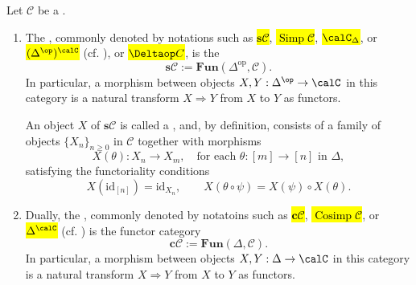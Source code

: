 \begin{definition} \label{definition:simplicial_cosimplicial_object_in_a_category}
    Let $\mathcal{C}$ be a .
    \begin{enumerate}
        \item   
        The , commonly denoted by notations such as \hl{$\mathbf{s}\mathcal{C}$}, \hl{$\operatorname{Simp} \mathcal{C}$}, \hl{$\calC_\Delta$}, or \hl{$(\Delta^{\op})^{\calC}$} (cf. ), or \hl{$\Deltaop C$}, is the 
        $$ \mathbf{s}\mathcal{C} := \mathbf{Fun}(\Delta^{\mathrm{op}}, \mathcal{C}).$$
          In particular, a morphism between objects $X,Y:\Delta^{\op} \to \calC$ in this category is a natural transform $X \Rightarrow Y$ from $X$ to $Y$ as functors. 

        An object $X$ of $\mathbf{s}\mathcal{C}$ is called a , and, by definition, consists of a family of objects $\{X_n\}_{n \ge 0}$ in $\mathcal{C}$ together with morphisms
        $$ X(\theta) : X_n \to X_m, \quad \text{for each } \theta : [m] \to [n] \text{ in } \Delta, $$
        satisfying the functoriality conditions
        $$ X(\mathrm{id}_{[n]}) = \mathrm{id}_{X_n}, \qquad X(\theta \circ \psi) = X(\psi) \circ X(\theta).  $$

        \item Dually, the , commonly denoted by notatoins such as \hl{$\mathbf{c}\mathcal{C}$}, \hl{$\operatorname{Cosimp} \mathcal{C}$}, or \hl{$\Delta^{\calC}$} (cf. ) is the functor category
        $$
        \mathbf{c}\mathcal{C} := \mathbf{Fun}(\Delta, \mathcal{C}).
        $$
        In particular, a morphism between objects $X,Y:\Delta \to \calC$ in this category is a natural transform $X \Rightarrow Y$ from $X$ to $Y$ as functors. 


\end{enumerate}
\end{definition}
